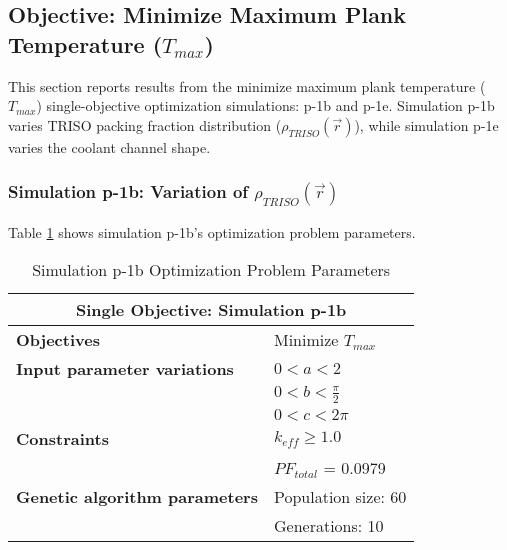 \subsection{Objective: Minimize Maximum Plank Temperature ($T_{max}$)}
\label{sec:plank-1-obj-temp}
This section reports results from the minimize maximum plank temperature 
($T_{max}$) single-objective optimization simulations: p-1b and p-1e. 
Simulation p-1b varies \gls{TRISO} packing fraction distribution 
($\rho_{TRISO}(\vec{r})$), while simulation p-1e varies the coolant channel shape. 

\subsubsection{Simulation p-1b: Variation of $\rho_{TRISO}(\vec{r})$}
Table \ref{tab:simulationp1b} shows simulation p-1b's optimization problem parameters. 
\begin{table}[htbp!]
    \centering
    \onehalfspacing
    \caption{Simulation p-1b Optimization Problem Parameters}
	\label{tab:simulationp1b}
    \footnotesize
    \begin{tabular}{l|p{3cm}}
    \hline 
    \multicolumn{2}{c}{\textbf{Single Objective: Simulation p-1b}} \\
    \hline 
    \textbf{Objectives} & Minimize $T_{max}$ \\
    \hline 
    \textbf{Input parameter variations} & $0<a<2$ \\
    & $0<b<\frac{\pi}{2}$ \\
    & $0<c<2\pi$ \\
    \hline
    \textbf{Constraints} & $k_{eff} \geq 1.0$\\ 
    & $PF_{total}$ = 0.0979\\
    \hline 
    \textbf{Genetic algorithm parameters} & Population size: 60 \\
    & Generations: 10 \\
    \hline
    \end{tabular}
\end{table}

